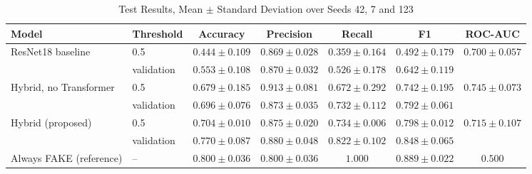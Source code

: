 \documentclass[conference]{IEEEtran}
\begin{document}
\begin{table}[t]
\caption{Test Results, Mean $\pm$ Standard Deviation over Seeds 42, 7 and 123}
\label{tab:results}
\centering
\footnotesize
\setlength{\tabcolsep}{4pt}
\begin{tabular}{llccccc}
\toprule
\textbf{Model} & \textbf{Threshold} & \textbf{Accuracy} & \textbf{Precision} &
\textbf{Recall} & \textbf{F1} & \textbf{ROC-AUC} \\
\midrule
\multirow{2}{*}{ResNet18 baseline} & 0.5 & $0.444\pm0.109$ & $0.869\pm0.028$ & $0.359\pm0.164$ & $0.492\pm0.179$ & \multirow{2}{*}{$0.700\pm0.057$} \\
 & validation & $0.553\pm0.108$ & $0.870\pm0.032$ & $0.526\pm0.178$ & $0.642\pm0.119$ & \\
\midrule
\multirow{2}{*}{Hybrid, no Transformer} & 0.5 & $0.679\pm0.185$ & $0.913\pm0.081$ & $0.672\pm0.292$ & $0.742\pm0.195$ & \multirow{2}{*}{$0.745\pm0.073$} \\
 & validation & $0.696\pm0.076$ & $0.873\pm0.035$ & $0.732\pm0.112$ & $0.792\pm0.061$ & \\
\midrule
\multirow{2}{*}{Hybrid (proposed)} & 0.5 & $0.704\pm0.010$ & $0.875\pm0.020$ & $0.734\pm0.006$ & $0.798\pm0.012$ & \multirow{2}{*}{$0.715\pm0.107$} \\
 & validation & $0.770\pm0.087$ & $0.880\pm0.048$ & $0.822\pm0.102$ & $0.848\pm0.065$ & \\
\midrule
Always FAKE (reference) & -- & $0.800\pm0.036$ & $0.800\pm0.036$ & $1.000$ & $0.889\pm0.022$ & $0.500$ \\
\bottomrule
\end{tabular}
\end{table}
\end{document}

